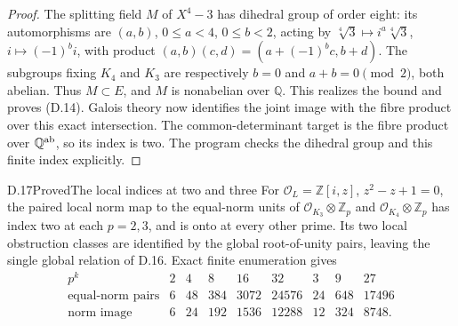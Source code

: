 \begin{proof}
The splitting field $M$ of $X^4-3$ has dihedral group of order eight: its automorphisms are $(a,b)$, $0\leq a<4$, $0\leq b<2$, acting by $\sqrt[4]3\mapsto i^a\sqrt[4]3$, $i\mapsto(-1)^b i$, with product $(a,b)(c,d)=(a+(-1)^bc,b+d)$. The subgroups fixing $K_4$ and $K_3$ are respectively $b=0$ and $a+b=0\pmod2$, both abelian. Thus $M\subset E$, and $M$ is nonabelian over $\mathbb Q$. This realizes the bound and proves (D.14). Galois theory now identifies the joint image with the fibre product over this exact intersection. The common-determinant target is the fibre product over $\mathbb Q^{\rm ab}$, so its index is two. The program checks the dihedral group and this finite index explicitly.
\end{proof}

\begin{statement}{D.17}{Proved}{The local indices at two and three}
For $\mathcal O_L=\mathbb Z[i,z]$, $z^2-z+1=0$, the paired local norm map to the equal-norm units of $\mathcal O_{K_3}\otimes\mathbb Z_p$ and $\mathcal O_{K_4}\otimes\mathbb Z_p$ has index two at each $p=2,3$, and is onto at every other prime. Its two local obstruction classes are identified by the global root-of-unity pairs, leaving the single global relation of D.16. Exact finite enumeration gives
\[
\begin{array}{c|rrrrrrrr}
 p^k&2&4&8&16&32&3&9&27\\\hline
 \text{equal-norm pairs}&6&48&384&3072&24576&24&648&17496\\
 \text{norm image}&6&24&192&1536&12288&12&324&8748.
\end{array}                                               \tag{D.15}
\]
\end{statement}
